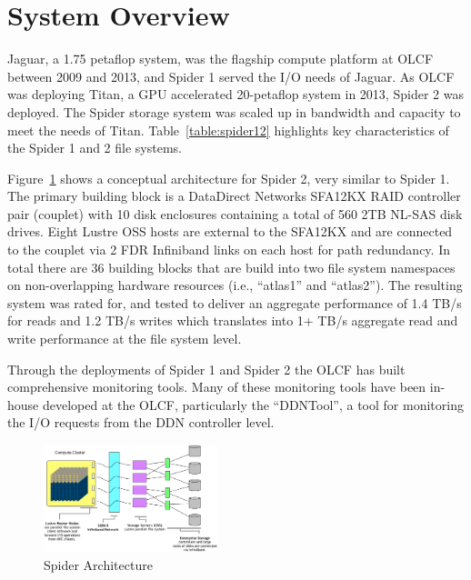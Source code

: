 \section{System Overview}
\label{sec:overview}

Jaguar, a 1.75 petaflop system, was the flagship compute platform at OLCF between
2009 and 2013, and Spider 1 served the I/O needs of Jaguar. As OLCF was
deploying Titan, a GPU accelerated 20-petaflop system in 2013, Spider 2 was
deployed. The Spider storage system was scaled up in bandwidth and capacity 
to meet the needs of Titan. Table~\ref{table:spider12} highlights key 
characteristics of the Spider 1 and 2 file systems. 


Figure~\ref{fig:arch} shows a conceptual architecture for Spider 2, very similar to Spider 1. 
The primary building block is a DataDirect Networks SFA12KX RAID controller
pair (couplet) with 10 disk enclosures containing a total of 560 2TB NL-SAS disk drives.
Eight Lustre OSS hosts are external to the SFA12KX and are connected to the couplet
via 2 FDR Infiniband links on each host for path redundancy. In total there are
36 building blocks that are build into two file system namespaces on
non-overlapping hardware resources (i.e., ``atlas1'' and ``atlas2''). The
resulting system was rated for, and tested to deliver an aggregate performance of 1.4 TB/s
for reads and 1.2 TB/s writes which translates into 1+ TB/s aggregate read and
write performance at the file system level.



Through the deployments of Spider 1 and Spider 2 the OLCF has built comprehensive
monitoring tools\cite{ddntool10:ross}. Many of these monitoring
tools have been in-house developed at the OLCF, particularly the ``DDNTool'', a
tool for monitoring the I/O requests from the DDN controller level. 



\begin{figure}[!t]
\centering
\includegraphics[width=0.45\textwidth]{./figs/spider2arch.ps}
\vspace{-0.1in}
\centering
\caption{Spider Architecture}
\label{fig:arch}
\end{figure}


